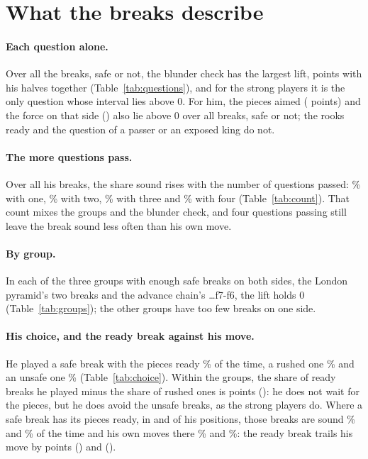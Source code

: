 \documentclass[11pt]{article}
\begin{document}
\section{What the breaks describe}

\paragraph{Each question alone.} Over all the breaks, safe or not, the blunder check has the
largest lift, \QSafe{} points with his halves together (Table~\ref{tab:questions}), and for the
strong players it is the only question whose interval lies above 0. For him, the pieces aimed
(\QAimed{} points) and the force on that side (\QForce) also lie above 0 over all breaks, safe or
not; the rooks ready and the question of a passer or an exposed king do not.

\QuestionTable

\paragraph{The more questions pass.} Over all his breaks, the share sound rises with the number
of questions passed: \CountOne\% with one, \CountTwo\% with two, \CountThree\% with three and
\CountFour\% with four (Table~\ref{tab:count}). That count mixes the groups and the blunder
check, and four questions passing still leave the break sound less often than his own move.

\CountTable

\paragraph{By group.} In each of the three groups with enough safe breaks on both sides, the
London pyramid's two breaks and the advance chain's \ldots f7-f6, the lift holds 0
(Table~\ref{tab:groups}); the other \GroupsOther{} groups have too few breaks on one side.

\GroupTable

\paragraph{His choice, and the ready break against his move.} He played a safe break with the
pieces ready \PlayedReady\% of the time, a rushed one \PlayedRushed\% and an unsafe one
\PlayedUnsafe\% (Table~\ref{tab:choice}). Within the groups, the share of ready breaks he
played minus the share of rushed ones is \ChoiceLift{} points (\ChoiceLiftCi): he does not wait
for the pieces, but he does avoid the unsafe breaks, as the strong players do. Where a safe break has its pieces ready, in \AgainstFirst{} and
\AgainstSecond{} of his positions, those breaks are sound \AgainstReadyFirst\% and
\AgainstReadySecond\% of the time and his own moves there \AgainstOwnFirst\% and
\AgainstOwnSecond\%: the ready break trails his move by \AgainstGainFirst{} points
(\AgainstGainFirstCi) and \AgainstGainSecond{} (\AgainstGainSecondCi).
\end{document}
